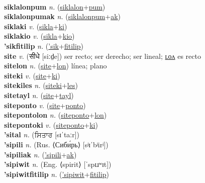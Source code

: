  \label{siklalon} \\
\textbf{siklalonpum} \textit{n.} (\hyperref[siklalon]{siklalon}+\hyperref[pum]{pum})
 \label{siklalonpum} \\
\textbf{siklalonpumak} \textit{n.} (\hyperref[siklalonpum]{siklalonpum}+\hyperref[ak]{ak})
 \label{siklalonpumak} \\
\textbf{siklaki} \textit{v.} (\hyperref[sikla]{sikla}+\hyperref[ki]{ki})
 \label{siklaki} \\
\textbf{siklakio} \textit{v.} (\hyperref[sikla]{sikla}+\hyperref[kio]{kio})
 \label{siklakio} \\
\textbf{'sikfitilip} \textit{n.} (\hyperref['sik]{'sik}+\hyperref[fitilip]{fitilip})
 \label{'sikfitilip} \\
\textbf{site} \textit{v.} ({\devanagari{}सीधे} [siːd̤e])
ser recto; ser derecho; ser lineal; \hyperref[sitelon]{ʟᴏᴧ} es recto \label{site} \\
\textbf{sitelon} \textit{n.} (\hyperref[site]{site}+\hyperref[lon]{lon})
línea; plano \label{sitelon} \\
\textbf{siteki} \textit{v.} (\hyperref[site]{site}+\hyperref[ki]{ki})
 \label{siteki} \\
\textbf{sitekiles} \textit{n.} (\hyperref[siteki]{siteki}+\hyperref[les]{les})
 \label{sitekiles} \\
\textbf{sitetayl} \textit{n.} (\hyperref[site]{site}+\hyperref[tayl]{tayl})
 \label{sitetayl} \\
\textbf{siteponto} \textit{v.} (\hyperref[site]{site}+\hyperref[ponto]{ponto})
 \label{siteponto} \\
\textbf{sitepontolon} \textit{n.} (\hyperref[siteponto]{siteponto}+\hyperref[lon]{lon})
 \label{sitepontolon} \\
\textbf{sitepontoki} \textit{v.} (\hyperref[siteponto]{siteponto}+\hyperref[ki]{ki})
 \label{sitepontoki} \\
\textbf{'sital} \textit{n.} ({\gurmukhi{}ਸਿਤਾਰ} [sɪˈtaːr])
 \label{'sital} \\
\textbf{'sipili} \textit{n.} (Rus. ⟨Сиби́рь⟩ [sʲɪˈbʲirʲ])
 \label{'sipili} \\
\textbf{'sipiliak} \textit{n.} (\hyperref['sipili]{'sipili}+\hyperref[ak]{ak})
 \label{'sipiliak} \\
\textbf{'sipiwit} \textit{n.} (Eng. ⟨spirit⟩ [ˈspɪɹʷɪt])
 \label{'sipiwit} \\
\textbf{'sipiwitfitilip} \textit{n.} (\hyperref['sipiwit]{'sipiwit}+\hyperref[fitilip]{fitilip})
 \label{'sipiwitfitilip} \\
